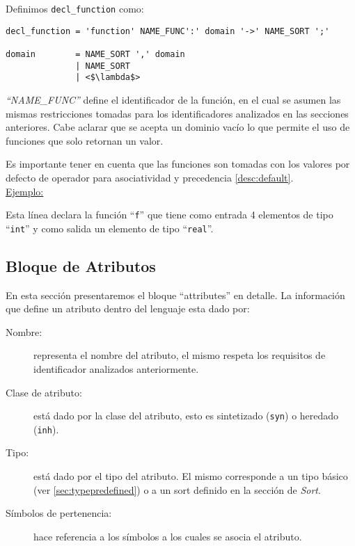Definimos \texttt{decl\_function} como:

\begin{lstlisting}[escapeinside=<>,frame=shadowbox, rulesepcolor=\color{blue}, language=inform ]
decl_function = 'function' NAME_FUNC':' domain '->' NAME_SORT ';'

domain        = NAME_SORT ',' domain
              | NAME_SORT 
              | <$\lambda$>
\end{lstlisting}

\textit{``NAME\_FUNC''} define el identificador de la función, en el cual se asumen las mismas restricciones tomadas para los identificadores analizados en las secciones anteriores. Cabe aclarar que se acepta un dominio vacío lo que permite el uso de funciones que solo retornan un valor.

Es importante tener en cuenta que las funciones son tomadas con los valores por defecto de operador para asociatividad y precedencia \ref{desc:default}.\\

\underline{Ejemplo:}\ \begin{center}
                                                                           \end{center}
\vspace{0.2cm}
Esta línea declara la función ``\texttt{f}'' que tiene como entrada 4 elementos de tipo ``\texttt{int}'' y como salida un elemento de tipo ``\texttt{real}''.

\subsection{Bloque de Atributos}
En esta sección presentaremos el bloque ``attributes'' en detalle. La información que define un atributo dentro del lenguaje esta dado por: 

\begin{description}
\item [Nombre:] representa el nombre del atributo, el mismo respeta los requisitos de identificador analizados anteriormente.

\item [Clase de atributo:] está dado por la clase del atributo, esto es sintetizado (\texttt{syn}) o heredado (\texttt{inh}).

\item [Tipo:] está dado por el tipo del atributo. El mismo corresponde a un tipo básico (ver \ref{sec:typepredefined}) o a un sort definido en la sección de \textit{Sort}.

\item [Símbolos de pertenencia:] hace referencia a los símbolos a los cuales se asocia el atributo.
\end{description}

